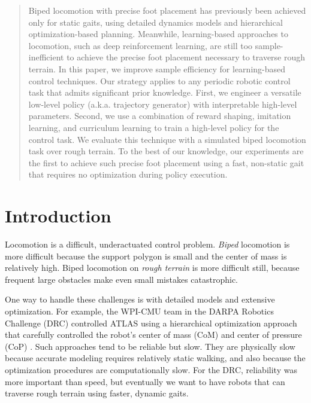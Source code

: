 \documentclass[conference]{IEEEtran}
\begin{document}
\begin{abstract}
  Biped locomotion with precise foot placement has previously been achieved only for static gaits, using detailed dynamics models and hierarchical optimization-based planning.
  Meanwhile, learning-based approaches to locomotion, such as deep reinforcement learning, are still too sample-inefficient to achieve the precise foot placement necessary to traverse rough terrain.
  In this paper, we improve sample efficiency for learning-based control techniques.
  Our strategy applies to any periodic robotic control task that admits significant prior knowledge.
  First, we engineer a versatile low-level policy (a.k.a. trajectory generator) with interpretable high-level parameters.
  Second, we use a combination of reward shaping, imitation learning, and curriculum learning to train a high-level policy for the control task.
  We evaluate this technique with a simulated biped locomotion task over rough terrain.
  To the best of our knowledge, our experiments are the first to achieve such precise foot placement
  using a fast, non-static gait that requires no optimization during policy execution.
\end{abstract}

\IEEEpeerreviewmaketitle


\section{Introduction} \label{sec:intro}

Locomotion is a difficult, underactuated control problem.
\emph{Biped} locomotion is more difficult because the support polygon is small and the center of mass is relatively high.
Biped locomotion on \emph{rough terrain} is more difficult still, because frequent large obstacles make even small mistakes catastrophic.

One way to handle these challenges is with detailed models and extensive optimization.
For example, the WPI-CMU team in the DARPA Robotics Challenge (DRC) controlled ATLAS using a hierarchical optimization approach that carefully controlled the robot's center of mass (CoM) and center of pressure (CoP) \citep{feng2015optimization}.
Such approaches tend to be reliable but slow.
They are physically slow because accurate modeling requires relatively static walking, and also because the optimization procedures are computationally slow.
For the DRC, reliability was more important than speed, but eventually we want to have robots that can traverse rough terrain using faster, dynamic gaits.
\end{document}

